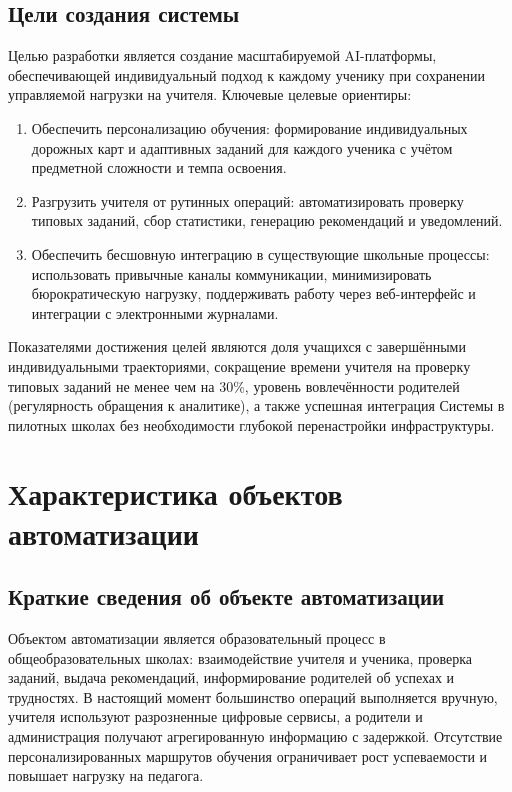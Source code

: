 \documentclass[14pt,a4paper]{extarticle}
\begin{document}
\subsection{Цели создания системы}
Целью разработки является создание масштабируемой AI-платформы, обеспечивающей индивидуальный подход к каждому ученику при сохранении управляемой нагрузки на учителя. Ключевые целевые ориентиры:
\begin{enumerate}
  \item Обеспечить персонализацию обучения: формирование индивидуальных дорожных карт и адаптивных заданий для каждого ученика с учётом предметной сложности и темпа освоения.
  \item Разгрузить учителя от рутинных операций: автоматизировать проверку типовых заданий, сбор статистики, генерацию рекомендаций и уведомлений.
  \item Обеспечить бесшовную интеграцию в существующие школьные процессы: использовать привычные каналы коммуникации, минимизировать бюрократическую нагрузку, поддерживать работу через веб-интерфейс и интеграции с электронными журналами.
\end{enumerate}
Показателями достижения целей являются доля учащихся с завершёнными индивидуальными траекториями, сокращение времени учителя на проверку типовых заданий не менее чем на 30\%, уровень вовлечённости родителей (регулярность обращения к аналитике), а также успешная интеграция Системы в пилотных школах без необходимости глубокой перенастройки инфраструктуры.

\section{Характеристика объектов автоматизации}
\subsection{Краткие сведения об объекте автоматизации}
Объектом автоматизации является образовательный процесс в общеобразовательных школах: взаимодействие учителя и ученика, проверка заданий, выдача рекомендаций, информирование родителей об успехах и трудностях. В настоящий момент большинство операций выполняется вручную, учителя используют разрозненные цифровые сервисы, а родители и администрация получают агрегированную информацию с задержкой. Отсутствие персонализированных маршрутов обучения ограничивает рост успеваемости и повышает нагрузку на педагога.
\end{document}
